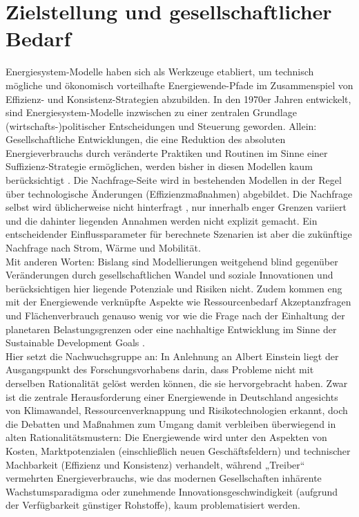 \documentclass[a4paper,11pt,twoside]{scrartcl}
\begin{document}
\onehalfspacing

\clearpage


{%

}

\setcounter{page}{1}

\section{Zielstellung und gesellschaftlicher Bedarf}
\label{sec:ziel}
Energiesystem-Modelle haben sich als Werkzeuge etabliert, um technisch mögliche und ökonomisch vorteilhafte Energiewende-Pfade im Zusammenspiel von Effizienz- und Konsistenz-Strategien abzubilden. In den 1970er Jahren entwickelt, sind Energiesystem-Modelle inzwischen zu einer zentralen Grundlage (wirtschafts-)politischer Entscheidungen und Steuerung geworden. Allein: Gesellschaftliche Entwicklungen, die eine Reduktion des absoluten Energieverbrauchs durch veränderte Praktiken und Routinen im Sinne einer Suffizienz-Strategie ermöglichen, werden bisher in diesen Modellen kaum berücksichtigt \cite{SAMADI2017}. Die Nachfrage-Seite wird in bestehenden Modellen in der Regel über technologische Änderungen (Effizienzmaßnahmen) abgebildet. Die Nachfrage selbst wird üblicherweise nicht hinterfragt \cite{Creutzig2018}, nur innerhalb enger Grenzen variiert und die dahinter liegenden Annahmen werden nicht explizit gemacht. Ein entscheidender Einflussparameter für berechnete Szenarien ist aber die zukünftige Nachfrage nach Strom, Wärme und Mobilität.\\ 
Mit anderen Worten: Bislang sind Modellierungen weitgehend blind gegenüber Veränderungen durch gesellschaftlichen Wandel und soziale Innovationen und berücksichtigen hier liegende Potenziale und Risiken nicht. Zudem kommen eng mit der Energiewende verknüpfte Aspekte wie Ressourcenbedarf \cite{Mocker2015,Buchert2011} Akzeptanzfragen \cite{Fuchs2016} und Flächenverbrauch \cite{Rink2011} genauso wenig vor wie die Frage nach der Einhaltung der planetaren Belastungsgrenzen \cite{Rockstroem2009} oder eine nachhaltige Entwicklung im Sinne der Sustainable Development Goals \cite{UN_SDG}.\\
Hier setzt die Nachwuchsgruppe an: In Anlehnung an Albert Einstein liegt der Ausgangspunkt des Forschungsvorhabens darin, dass Probleme nicht mit derselben Rationalität gelöst werden können, die sie hervorgebracht haben. Zwar ist die zentrale Herausforderung einer Energiewende in Deutschland angesichts von Klimawandel, Ressourcenverknappung und Risikotechnologien erkannt, doch die Debatten und Maßnahmen zum Umgang damit verbleiben überwiegend in alten Rationalitätsmustern: Die Energiewende wird unter den Aspekten von Kosten, Marktpotenzialen (einschließlich neuen Geschäftsfeldern) und technischer Machbarkeit (Effizienz und Konsistenz) verhandelt, während „Treiber“ vermehrten Energieverbrauchs, wie das modernen Gesellschaften inhärente Wachstumsparadigma oder zunehmende Innovationsgeschwindigkeit (aufgrund der Verfügbarkeit günstiger Rohstoffe), kaum problematisiert werden. 
\end{document}
